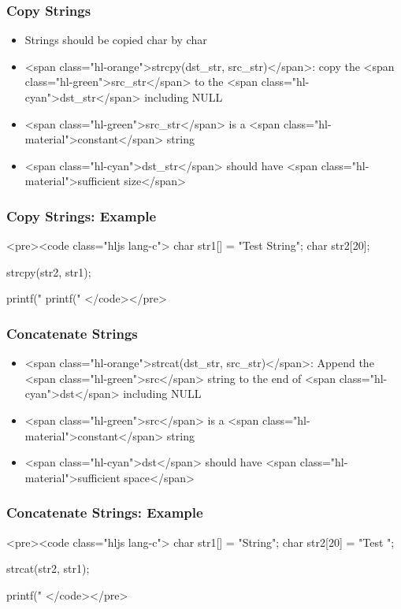 \documentclass{../c-lecture}
\begin{document}
\begin{frame}
  \frametitle{Copy Strings}
  \begin{itemize}
    \item Strings should be copied char by char
    \item
      <span class="hl-orange">strcpy(dst_str, src_str)</span>: copy the
      <span class="hl-green">src_str</span> to the
      <span class="hl-cyan">dst_str</span> including NULL

    \item
      <span class="hl-green">src_str</span> is a
      <span class="hl-material">constant</span> string

    \item
      <span class="hl-cyan">dst_str</span> should have
      <span class="hl-material">sufficient size</span>

  \end{itemize}
\end{frame}
\begin{frame}
  \frametitle{Copy Strings: Example}
  <pre><code class="hljs lang-c">
char str1[] = "Test String";
char str2[20];

strcpy(str2, str1);

printf("%
printf("%
  </code></pre>
\end{frame}
\begin{frame}
  \frametitle{Concatenate Strings}
  \begin{itemize}
    \item
      <span class="hl-orange">strcat(dst_str, src_str)</span>: Append the
      <span class="hl-green">src</span> string to the end of
      <span class="hl-cyan">dst</span> including NULL

    \item
      <span class="hl-green">src</span> is a
      <span class="hl-material">constant</span> string

    \item
      <span class="hl-cyan">dst</span> should have
      <span class="hl-material">sufficient space</span>

  \end{itemize}
\end{frame}
\begin{frame}
  \frametitle{Concatenate Strings: Example}
  <pre><code class="hljs lang-c">
char str1[] = "String";
char str2[20] = "Test ";

strcat(str2, str1);

printf("%
  </code></pre>
\end{frame}
\end{document}
